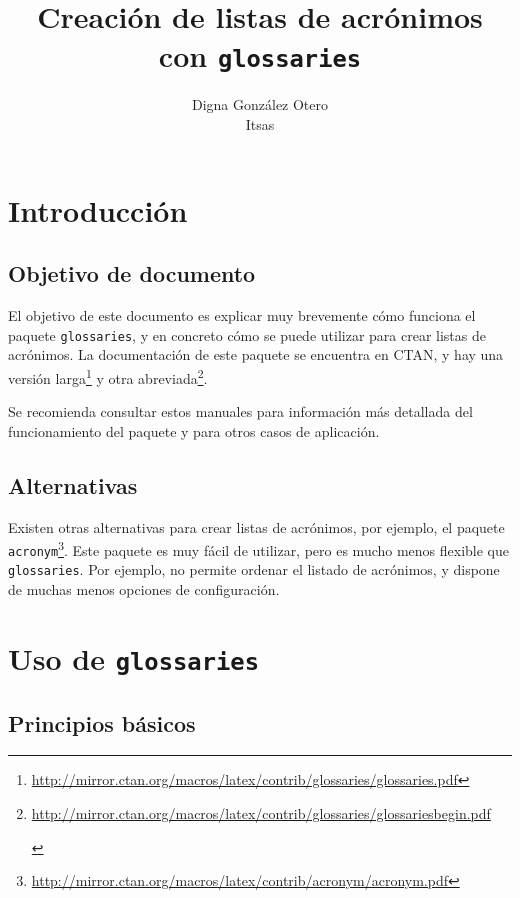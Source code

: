 \documentclass[11pt]{article}
\title{Creaci\'on de listas de acr\'onimos con \texttt{glossaries}}
\author{Digna Gonz\'alez Otero\\Itsas}
\begin{document}
\maketitle
\tableofcontents 

 \section{Introducci\'on}
 
 \subsection{Objetivo de documento}
El objetivo de este documento es explicar muy brevemente c\'omo funciona el
paquete \texttt{glossaries}, y en concreto c\'omo se puede utilizar para crear
listas de acr\'onimos. La documentaci\'on de este paquete se encuentra en CTAN,
y hay una versi\'on larga\footnote{\url{
http://mirror.ctan.org/macros/latex/contrib/glossaries/glossaries.pdf}}
y otra abreviada\footnote{\begin{scriptsize}\url{
http://mirror.ctan.org/macros/latex/contrib/glossaries/glossariesbegin.pdf}     
                                                                 
\end{scriptsize}}.

Se recomienda consultar estos manuales para informaci\'on m\'as detallada del
funcionamiento del paquete y para otros casos de aplicaci\'on.

\subsection{Alternativas}

Existen otras alternativas para crear listas de acr\'onimos, por ejemplo, el
paquete
\texttt{acronym}\footnote{\url{
http://mirror.ctan.org/macros/latex/contrib/acronym/acronym.pdf}}. Este
paquete es muy f\'acil de utilizar, pero es mucho menos flexible que
\texttt{glossaries}. Por ejemplo, no permite ordenar el listado de
acr\'onimos, y dispone de muchas menos opciones de configuraci\'on.

\section{Uso de \texttt{glossaries}}

\subsection{Principios b\'asicos}
\end{document}
